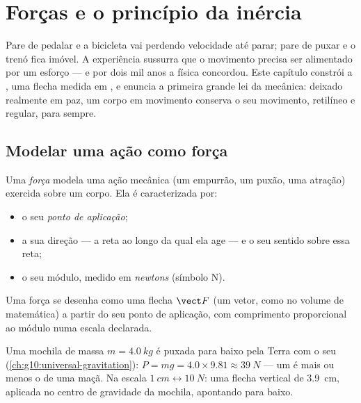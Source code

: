 \chapter{Forças e o princípio da inércia}\label{ch:g10:inertia}

Pare de pedalar e a bicicleta vai perdendo velocidade até parar; pare de
puxar e o trenó fica imóvel. A experiência sussurra que o movimento
precisa ser alimentado por um esforço --- e por dois mil anos a física
concordou. Este capítulo constrói a , uma flecha medida em ,
e enuncia a primeira grande lei da mecânica: deixado realmente em paz, um
corpo em movimento conserva o seu movimento, retilíneo e regular, para
sempre.

\section{Modelar uma ação como força}

\begin{definition}[Força]\label{def:g10:inertia:force}
Uma \emph{força} modela uma ação mecânica (um empurrão, um
puxão, uma atração) exercida sobre um corpo. Ela é caracterizada por:
\begin{itemize}
  \item o seu \emph{ponto de aplicação};
  \item a sua direção --- a reta ao longo da qual ela age --- e o seu
        sentido sobre essa reta;
  \item o seu módulo, medido em \emph{newtons} (símbolo
        \unit{N}).
\end{itemize}
Uma força se desenha como uma flecha $\vect F$ (um vetor, como no volume
de matemática) a partir do seu ponto de aplicação, com comprimento
proporcional ao módulo numa escala declarada.
\end{definition}

\begin{example}\label{ex:g10:inertia:schoolbag}
Uma mochila de massa $m = \qty{4.0}{kg}$ é puxada para baixo pela Terra
com o seu  (\cref{ch:g10:universal-gravitation}):
$P = mg = 4.0 \times 9.81 \approx \qty{39}{N}$ --- um  é mais ou
menos o  de uma maçã. Na escala $\qty{1}{cm} \leftrightarrow
\qty{10}{N}$: uma flecha vertical de \qty{3.9}{cm}, aplicada no centro de
gravidade da mochila, apontando para baixo.
\end{example}

